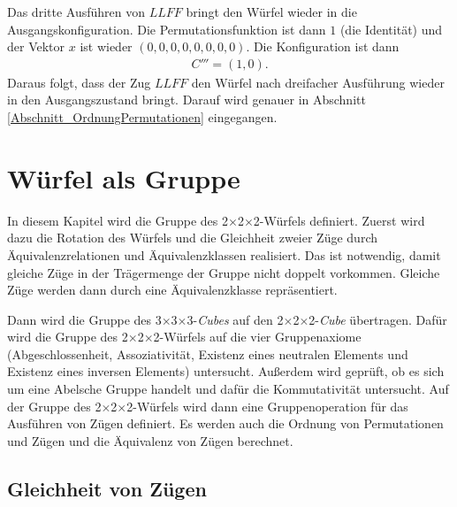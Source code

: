 \documentclass[12pt,a4paper, usenames, dvipsnames]{article}
\theoremstyle{mystyle}
\theoremstyle{definition}
\newcommand{\Ttwo}{2$\times$2$\times$2-}
\newcommand{\Tthree}{3$\times$3$\times$3-}
\begin{document}
Das dritte Ausführen von $LLFF$ bringt den Würfel wieder in die Ausgangskonfiguration. Die Permutationsfunktion ist dann $1$ (die Identität) und der Vektor $x$ ist wieder $(0,0,0,0,0,0,0,0)$. Die Konfiguration ist dann
\begin{align*}
C''' = (1,0).
\end{align*}
Daraus folgt, dass der Zug $LLFF$ den Würfel nach dreifacher Ausführung wieder in den Ausgangszustand bringt. Darauf wird genauer in Abschnitt \ref{Abschnitt_OrdnungPermutationen} eingegangen.

%
%
%
%
%
%
%
%
%
%
%
%
%
%

\newpage
\section{Würfel als Gruppe}

\label{Kapitel_WürfelAlsGruppe}

In diesem Kapitel wird die Gruppe des \Ttwo Würfels definiert. Zuerst wird dazu die Rotation des Würfels und die Gleichheit zweier Züge durch Äquivalenz\-relationen und Äquivalenzklassen realisiert. Das ist notwendig, damit gleiche Züge in der Trägermenge der Gruppe nicht doppelt vorkommen. Gleiche Züge werden dann durch eine Äquivalenzklasse repräsentiert. 

Dann wird die Gruppe des \Tthree \textit{Cubes} \cite{JC} auf den \Ttwo \textit{Cube} übertragen. 
Dafür wird die Gruppe des \Ttwo Würfels auf die vier Gruppenaxiome (Abgeschlossenheit, Assoziativität, Existenz eines neutralen Elements und Existenz eines inversen Elements) untersucht. Außerdem wird geprüft, ob es sich um eine Abelsche Gruppe handelt und dafür die Kommutativität untersucht. Auf der Gruppe des \Ttwo Würfels wird dann eine Gruppenoperation für das Ausführen von Zügen definiert. Es werden auch die Ordnung von Permutationen und Zügen und die Äquivalenz von Zügen berechnet.



%
%
%
%
%
%
%
%
%
%
%
%
%
%
%
%
%
%
%

\subsection{Gleichheit von Zügen} 

\label{Abschnitt_GleichheitVonZügen}
\end{document}
